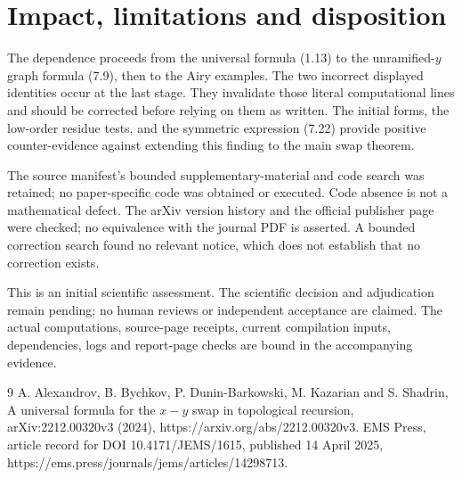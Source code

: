 \documentclass[10pt]{article}
\begin{document}
\section*{Impact, limitations and disposition}
The dependence proceeds from the universal formula (1.13) to the unramified-\(y\) graph formula (7.9), then to the Airy examples. The two incorrect displayed identities occur at the last stage. They invalidate those literal computational lines and should be corrected before relying on them as written. The initial forms, the low-order residue tests, and the symmetric expression (7.22) provide positive counter-evidence against extending this finding to the main swap theorem.\par
The source manifest’s bounded supplementary-material and code search was retained; no paper-specific code was obtained or executed. Code absence is not a mathematical defect. The arXiv version history and the official publisher page were checked; no equivalence with the journal PDF is asserted. A bounded correction search found no relevant notice, which does not establish that no correction exists.\par
This is an initial scientific assessment. The scientific decision and adjudication remain pending; no human reviews or independent acceptance are claimed. The actual computations, source-page receipts, current compilation inputs, dependencies, logs and report-page checks are bound in the accompanying evidence.\par
9 A. Alexandrov, B. Bychkov, P. Dunin-Barkowski, M. Kazarian and S. Shadrin, A universal formula for the \(x-y\) swap in topological recursion, arXiv:2212.00320v3 (2024), https://arxiv.org/abs/2212.00320v3. EMS Press, article record for DOI 10.4171/JEMS/1615, published 14 April 2025, https://ems.press/journals/jems/articles/14298713.\par
\end{document}
